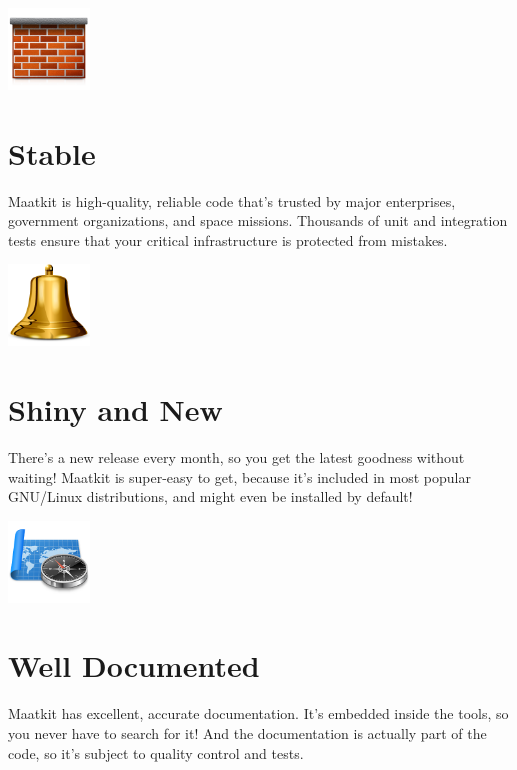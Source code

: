 \documentclass[letterpaper,twoside,12pt]{article}
\begin{document}
\begin{minipage}{0.2\textwidth}
\includegraphics[width=0.853in]{../image/firewall}
\end{minipage}
\begin{minipage}{0.8\textwidth}
\section*{Stable}
Maatkit is high-quality, reliable code that's trusted by major enterprises,
government organizations, and space missions. Thousands of unit and
integration tests ensure that your critical infrastructure is protected from
mistakes.
\end{minipage}
\vspace*{1cm}

\begin{minipage}{0.2\textwidth}
\includegraphics[width=0.853in]{../image/bell}
\end{minipage}
\begin{minipage}{0.8\textwidth}
\section*{Shiny and New}
There's a new release every month, so you get the latest goodness without
waiting!  Maatkit is super-easy to get, because it's included in most popular
GNU/Linux distributions, and might even be installed by default!
\end{minipage}
\vspace*{1cm}

\begin{minipage}{0.2\textwidth}
\includegraphics[width=0.853in]{../image/documentation}
\end{minipage}
\begin{minipage}{0.8\textwidth}
\section*{Well Documented}
Maatkit has excellent, accurate documentation. It's embedded inside the
tools, so you never have to search for it! And the documentation is
actually part of the code, so it's subject to quality control and
tests.
\end{minipage}
\vspace*{1cm}
\end{document}
